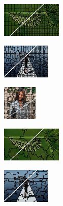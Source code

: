 \begin{figure}
\begin{subfigure}[b]{0.02\textwidth}
	\end{subfigure}
	\begin{subfigure}[b]{0.16\textwidth}
		\includegraphics[height=1.65cm]{pictures/bsds500/rw/cropped/rw_35028_contours}
	\end{subfigure}
	\begin{subfigure}[b]{0.129\textwidth}
		\includegraphics[height=1.65cm]{pictures/sbd/rw/cropped/rw_0004774_contours}
	\end{subfigure}
	\begin{subfigure}[b]{0.10\textwidth}
		\includegraphics[height=1.65cm]{pictures/fash/rw/cropped/rw_010_contours}
	\end{subfigure}
	\begin{subfigure}[b]{0.02\textwidth}
	\end{subfigure}
	\begin{subfigure}[b]{0.16\textwidth}
		\includegraphics[height=1.65cm]{pictures/bsds500/qs/cropped/qs_35028_contours}
	\end{subfigure}
	\begin{subfigure}[b]{0.129\textwidth}
		\includegraphics[height=1.65cm]{pictures/sbd/qs/cropped/qs_0004774_contours}
	\end{subfigure}
	\begin{subfigure}[b]{0.10\textwidth}

\end{subfigure}
\end{figure}
